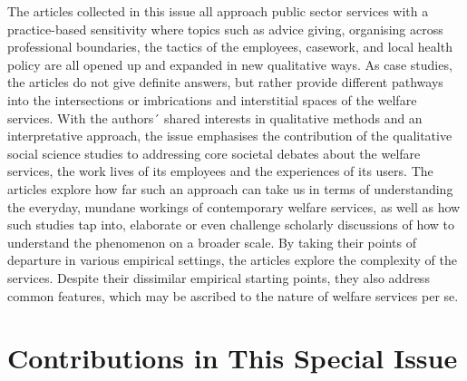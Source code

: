 \par
The articles collected in this issue all approach public sector services with a practice-based sensitivity where topics such as advice giving, organising across professional boundaries, the tactics of the employees, casework, and local health policy are all opened up and expanded in new qualitative ways. As case studies, the articles do not give definite answers, but rather provide different pathways into the intersections or imbrications and interstitial spaces of the welfare services. With the authors´ shared interests in qualitative methods and an interpretative approach, the issue emphasises the contribution of the qualitative social science studies to addressing core societal debates about the welfare services, the work lives of its employees and the experiences of its users. The articles explore how far such an approach can take us in terms of understanding the everyday, mundane workings of contemporary welfare services, as well as how such studies tap into, elaborate or even challenge scholarly discussions of how to understand the phenomenon on a broader scale.  By taking their points of departure in various empirical settings, the articles explore the complexity of the services. Despite their dissimilar empirical starting points, they also address common features, which may be ascribed to the nature of welfare services per se.

\chapter{Contributions in This Special Issue}
